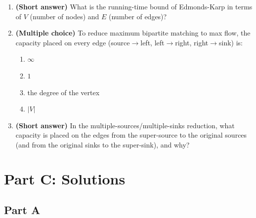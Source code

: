 \documentclass[11pt]{article}
\begin{document}
\begin{enumerate}[label=\textbf{B\arabic*.}, leftmargin=2.2em]
\item \textbf{(Short answer)} What is the running-time bound of Edmonds-Karp in terms of
$V$ (number of nodes) and $E$ (number of edges)?

\item \textbf{(Multiple choice)} To reduce maximum bipartite matching to max flow, the
capacity placed on every edge (source$\to$left, left$\to$right, right$\to$sink) is:
\begin{enumerate}[label=(\alph*)]
    \item $\infty$
    \item $1$
    \item the degree of the vertex
    \item $|V|$
\end{enumerate}

\item \textbf{(Short answer)} In the multiple-sources/multiple-sinks reduction, what
capacity is placed on the edges from the super-source to the original sources (and from the
original sinks to the super-sink), and why?

\end{enumerate}

\newpage
\section*{Part C: Solutions}

\subsection*{Part A}
\end{document}

